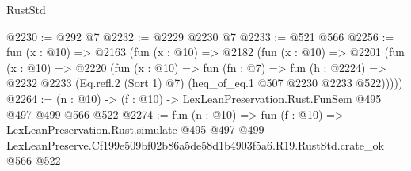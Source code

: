 \begin{lexlean}{RustStd}
\begin{coremodule}
@2230 := @292 @7
@2232 := @2229 @2230 @7
@2233 := @521 @566
@2256 := fun (x : @10) =>
  @2163
    (fun (x : @10) =>
    @2182
      (fun (x : @10) =>
      @2201
        (fun (x : @10) =>
        @2220
          (fun (x : @10) =>
          fun (fn : @7) =>
          fun (h : @2224) =>
          @2232 @2233 (Eq.refl.{2} (Sort 1) @7) (heq_of_eq.{1} @507 @2230 @2233 @522)))))
@2264 := (n : @10) -> (f : @10) -> LexLeanPreservation.Rust.FunSem @495 @497 @499 @566 @522
@2274 := fun (n : @10) =>
  fun (f : @10) =>
  LexLeanPreservation.Rust.simulate
    @495
    @497
    @499
    LexLeanPreserve.Cf199e509bf02b86a5de58d1b4903f5a6.R19.RustStd.crate_ok
    @566
    @522
\end{coremodule}
\end{lexlean}
